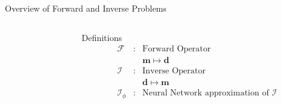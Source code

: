 \begin{frame}{Overview of Forward and Inverse Problems}
\begin{columns}
\begin{column}{0.35\textwidth}

\end{column}
%
\begin{column}{0.55\textwidth}
\vspace{0,15cm}
\begin{block}{Definitions}
\begin{equation*}
  \begin{array}{cll}
    \mathcal{F} &: & \text{Forward Operator} \\
    & & \boldsymbol{m} \mapsto \boldsymbol{d} \\[2mm]
   \mathcal{I} &: & \text{Inverse Operator} \\
    & & \boldsymbol{d} \mapsto \boldsymbol{m} \\[2mm]
    \mathcal{I}_{\phi} &: & \text{Neural Network approximation of } \mathcal{I}
  \end{array}
\end{equation*}
\end{block}

\end{column}
\end{columns}
\end{frame}

